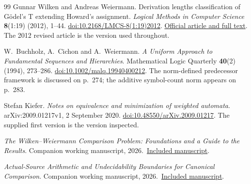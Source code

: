\begin{thebibliography}{99}
Gunnar Wilken and Andreas Weiermann.
Derivation lengths classification of G\"odel's T extending Howard's assignment.
\emph{Logical Methods in Computer Science} \textbf{8}(1:19) (2012), 1--44.
\href{https://doi.org/10.2168/LMCS-8(1:19)2012}
{doi:10.2168/LMCS-8(1:19)2012}.
\href{https://lmcs.episciences.org/1073}{Official article and full text}.
The 2012 revised article is the version used throughout.

W.~Buchholz, A.~Cichon and A.~Weiermann.
\emph{A Uniform Approach to Fundamental Sequences and Hierarchies}.
Mathematical Logic Quarterly \textbf{40}(2) (1994), 273--286.
\href{https://doi.org/10.1002/malq.19940400212}{doi:10.1002/malq.19940400212}.
The norm-defined predecessor framework is discussed on p.~274; the
additive symbol-count norm appears on p.~283.

Stefan Kiefer.
\emph{Notes on equivalence and minimization of weighted automata}.
arXiv:2009.01217v1, 2 September 2020.
\href{https://doi.org/10.48550/arXiv.2009.01217}
{doi:10.48550/arXiv.2009.01217}.
The supplied first version is the version inspected.

\emph{The Wilken--Weiermann Comparison Problem: Foundations and a Guide to the Results}. Companion working manuscript, 2026.\
\href{../05-wilken-weiermann-foundations/paper.pdf}{Included manuscript}.

\emph{Actual-Source Arithmetic and Undecidability Boundaries for Canonical Comparison}. Companion working manuscript, 2026.\
\href{../09-canonical-source-expressivity/paper.pdf}{Included manuscript}.
\end{thebibliography}
